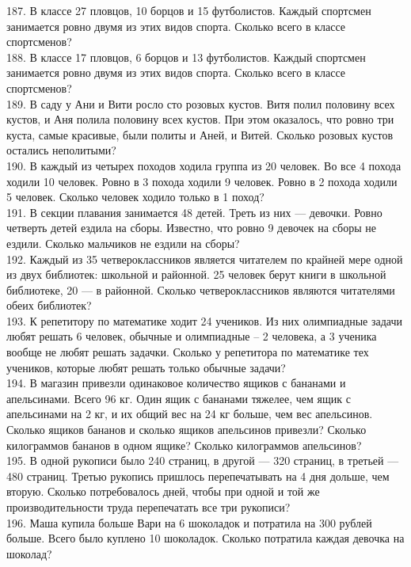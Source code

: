 \documentclass[12pt]{article}
\begin{document}
187. В классе 27 пловцов, 10 борцов и 15 футболистов. Каждый спортсмен занимается ровно двумя из этих видов спорта. Сколько всего в классе спортсменов?\\
188. В классе 17 пловцов, 6 борцов и 13 футболистов. Каждый спортсмен занимается ровно двумя из этих видов спорта. Сколько всего в классе спортсменов?\\
189. В саду у Ани и Вити росло сто розовых кустов. Витя полил половину всех кустов, и Аня полила половину всех кустов. При этом оказалось, что ровно три куста, самые красивые, были политы и Аней, и Витей. Сколько розовых кустов остались неполитыми?\\
190. В каждый из четырех походов ходила группа из 20 человек. Во все 4 похода ходили 10 человек. Ровно в 3 похода ходили 9 человек. Ровно в 2 похода ходили 5 человек. Сколько человек ходило только в 1 поход?\\
191. В секции плавания занимается 48 детей. Треть из них --- девочки. Ровно четверть детей ездила на сборы. Известно, что ровно 9 девочек на сборы не ездили. Сколько мальчиков не ездили на сборы?\\
192. Каждый из 35 четвероклассников является читателем по крайней мере одной из двух библиотек: школьной и районной. 25 человек берут книги в школьной библиотеке, 20 --- в районной. Сколько четвероклассников являются читателями обеих библиотек?\\
193.  К репетитору по математике ходит 24 учеников. Из них олимпиадные задачи любят решать 6 человек, обычные и олимпиадные – 2 человека, а 3 ученика вообще не любят решать задачки. Сколько у репетитора по математике тех учеников, которые любят решать только обычные задачи?\\
194. В магазин привезли одинаковое количество ящиков с бананами и апельсинами. Всего 96 кг.  Один ящик с бананами тяжелее, чем ящик с апельсинами на 2 кг, и их общий вес на 24 кг больше, чем вес апельсинов. Сколько ящиков бананов и сколько  ящиков апельсинов привезли? Сколько килограммов бананов в одном ящике? Сколько килограммов апельсинов?\\
195. В одной рукописи было 240 страниц, в другой --- 320 страниц, в третьей --- 480 страниц. Третью рукопись пришлось перепечатывать на 4 дня дольше, чем вторую. Сколько потребовалось дней, чтобы при одной и той же производительности труда перепечатать все три рукописи?\\
196. Маша купила больше Вари на 6 шоколадок и потратила на 300 рублей больше. Всего было куплено 10 шоколадок. Сколько потратила каждая девочка на шоколад?\\
\end{document}
